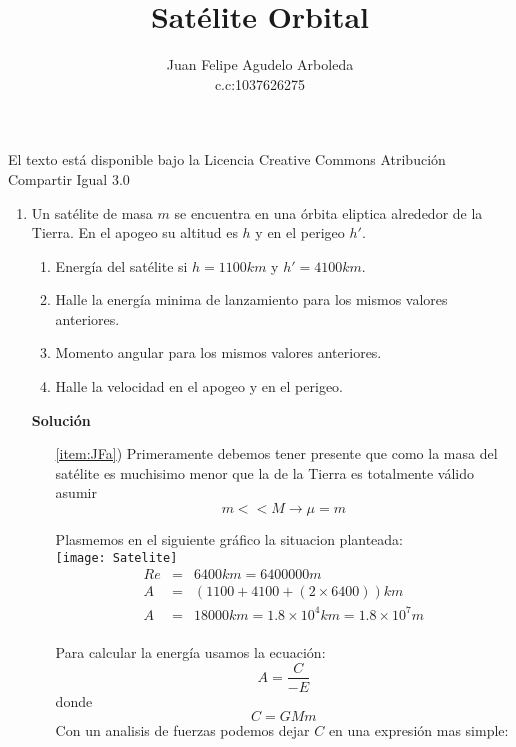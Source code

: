 \documentclass[12pt]{article}
\title{Satélite Orbital}
\author{Juan Felipe Agudelo Arboleda \\c.c:1037626275}
\begin{document}
\maketitle


El texto está disponible bajo la Licencia Creative Commons Atribución Compartir Igual 3.0
\begin{enumerate} 

\item Un satélite de masa $m$ se encuentra en una órbita eliptica alrededor de la Tierra. En el apogeo su altitud es $h$ y en el perigeo $h'$. 

 
  \begin{minipage}{0.6\linewidth}
    \begin{enumerate}
    \item Energía del satélite si $h=1100 km$ y $h'=4100 km$.
      \label{item:JFa}
    \item Halle la energía minima de lanzamiento para los mismos valores anteriores.
      \label{item:JFb}
      \item Momento angular para los mismos valores anteriores.
      \label{item:JFc}    
     \item Halle la velocidad en el apogeo y en el perigeo.
      \label{item:JFd}
    \end{enumerate}
  \end{minipage}
  
  \textbf{Solución}
  \begin{itemize}  
  
  \item[\ref{item:JFa})]
  Primeramente debemos tener presente que como la masa del satélite es muchisimo menor que la de la Tierra es totalmente válido asumir
\begin{equation} 
m<<M\rightarrow\mu=m\nonumber
\end{equation}

Plasmemos en el siguiente gráfico la situacion planteada:\\
  \texttt{[image: Satelite]}\\
  \begin{eqnarray}
  Re&=&6400 km=6400000 m\nonumber\\ 
  A&=&(1100+4100+(2\times6400)) km\nonumber\\
  A&=&18000  km = 1.8\times10^4 km = 1.8\times10^7 m\\
   \nonumber
 \end{eqnarray}
 
 Para calcular la energía usamos la ecuación:
\begin{equation}
A=\frac{C}{-E}\nonumber
\end{equation}
donde
\begin{equation}
C=G M m\nonumber
\end{equation} 
Con un analisis de fuerzas podemos dejar $C$ en una expresión mas simple:\\
\begin{center}



\end{center}
\end{itemize}
\end{enumerate}
\end{document}
